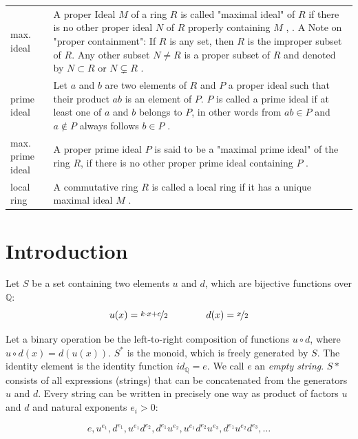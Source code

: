 \documentclass[12pt]{amsart}
\theoremstyle{definition}
\begin{document}
{\begin{table}[H]
\begin{tabular}{|P{1.4cm} p{13.4cm}|}
		\\
		max. ideal & A proper Ideal $M$ of a ring $R$ is called "maximal ideal" of $R$  if there is no other proper ideal $N$ of $R$ properly containing $M$ \cite[p.~247]{Ref_Fraleigh_2014}, \cite[p.~37]{Ref_Northcott_1953}. A Note on "proper containment": If $R$ is any set, then $R$ is the improper subset of $R$. Any other subset $N\ne R$ is a proper subset of $R$ and denoted by $N\subset R$ or $N\varsubsetneq R$ \cite[p.~2]{Ref_Fraleigh_2014}.
		\\
		prime ideal & Let $a$ and $b$ are two elements of $R$ and $P$ a proper ideal such that their product $ab$ is an element of $P$. $P$ is called a prime ideal if at least one of $a$ and $b$ belongs to $P$, in other words from $ab\in P$ and $a\notin P$ always follows $b\in P$ \cite[p.~9]{Ref_Northcott_1953}.
		\\
		max. prime ideal & A proper prime ideal $P$ is said to be a "maximal prime ideal" of the ring $R$, if there is no other proper prime ideal containing $P$ \cite[p.~23]{Ref_Northcott_1953}.
		\\
		local ring & A commutative ring $R$ is called a local ring if it has a unique maximal ideal $M$ \cite[p.~522]{Ref_Rotman_2005}.
		\\ \hline
	\end{tabular}
\end{table}}

\section{Introduction}
\label{introduction}

Let $S$ be a set containing two elements $u$ and $d$, which are bijective functions over $\mathbb{Q}$:
\begin{equation}
u(x)=\nicefrac{k\cdot x+c}{2}\hspace{4em} d(x)=\nicefrac{x}{2}
\end{equation}

Let a binary operation be the left-to-right composition of functions $u\circ d$, where $u\circ d(x)=d(u(x))$. $S^\ast$ is the monoid, which is freely generated by $S$. The identity element is the identity function $id_{\mathbb{Q}}=e$. We call $e$ an \textit{empty string}. $S*$ consists of all expressions (strings) that can be concatenated from the generators $u$ and $d$. Every string can be written in precisely one way as product of factors $u$ and $d$ and natural exponents $e_i>0$:

\[
e,u^{e_1},d^{e_1},u^{e_1}d^{e_2},d^{e_1}u^{e_2},u^{e_1}d^{e_2}u^{e_3},d^{e_1}u^{e_2}d^{e_3},\ldots
\]
\end{document}
